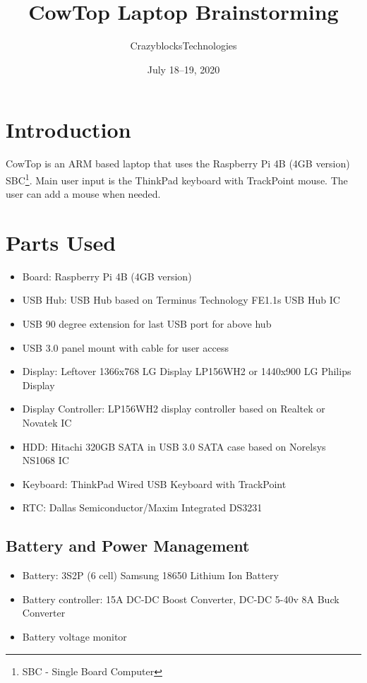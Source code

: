 \documentclass[12pt]{article}
\title{\textbf{CowTop Laptop Brainstorming}}
\author{CrazyblocksTechnologies}
\date{July 18--19, 2020}
\begin{document}
\maketitle

\tableofcontents
\pagebreak

\section{Introduction}

CowTop is an ARM based laptop that uses the Raspberry Pi 4B (4GB version) SBC\footnote{SBC - Single Board Computer}. Main user input is the ThinkPad keyboard with TrackPoint mouse. The user can add a mouse when needed. 


\section{Parts Used}
\begin{itemize}
\item Board: Raspberry Pi 4B (4GB version)
\item USB Hub: USB Hub based on Terminus Technology FE1.1s USB Hub IC
\item USB 90 degree extension for last USB port for above hub
\item USB 3.0 panel mount with cable for user access
\item Display: Leftover 1366x768 LG Display LP156WH2 or 1440x900 LG Philips Display
\item Display Controller: LP156WH2 display controller based on Realtek or Novatek IC
\item HDD: Hitachi 320GB SATA in USB 3.0 SATA case based on Norelsys NS1068 IC
\item Keyboard: ThinkPad Wired USB Keyboard with TrackPoint
\item RTC: Dallas Semiconductor/Maxim Integrated DS3231
\end{itemize}
\subsection{Battery and Power Management}
\begin{itemize}
\item Battery: 3S2P (6 cell) Samsung 18650 Lithium Ion Battery
\item Battery controller: 15A DC-DC Boost Converter, DC-DC 5-40v 8A Buck Converter
\item Battery voltage monitor
\end{itemize}
\end{document}
